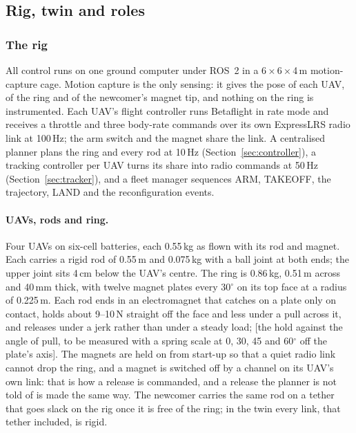
\subsection{Rig, twin and roles}
\label{sec:overview}

\subsubsection{The rig}
\label{sec:hardware}

All control runs on one ground computer under ROS~2 in a 6\,$\times$\,6\,$\times$\,4\,m motion-capture cage.
Motion capture is the only sensing: it gives the pose of each UAV, of the ring and of the newcomer's magnet tip, and
nothing on the ring is instrumented. Each UAV's flight controller runs Betaflight in rate mode and receives a throttle
and three body-rate commands over its own ExpressLRS radio link at 100\,Hz; the arm switch and the magnet share the
link. A centralised planner plans the ring and every rod at 10\,Hz (Section~\ref{sec:controller}), a tracking
controller per UAV turns its share into radio commands at 50\,Hz (Section~\ref{sec:tracker}), and a fleet manager
sequences ARM, TAKEOFF, the trajectory, LAND and the reconfiguration events.

\paragraph{UAVs, rods and ring.} Four UAVs on six-cell batteries, each 0.55\,kg as flown with its rod and magnet. Each carries a rigid rod of 0.55\,m and 0.075\,kg with a ball joint at both
ends; the upper joint sits 4\,cm below the UAV's centre. The ring is 0.86\,kg, 0.51\,m across and 40\,mm thick, with
twelve magnet plates every 30$^\circ$ on its top face at a radius of 0.225\,m. Each rod ends in an electromagnet
that catches on a plate only on contact, holds about 9--10\,N straight off the face and less under a pull across
it, and releases under a jerk rather than under a steady load; [the hold against the angle of pull, to be measured
with a spring scale at 0, 30, 45 and 60$^\circ$ off the plate's axis]. The magnets are held on from
start-up so that a quiet radio link cannot drop the ring, and a magnet is switched off by a channel on its UAV's
own link: that is how a release is commanded, and a release the planner is not told of is made the same way. The
newcomer carries the same rod on a tether that goes slack on the rig once it is free of the ring; in the twin
every link, that tether included, is rigid.

